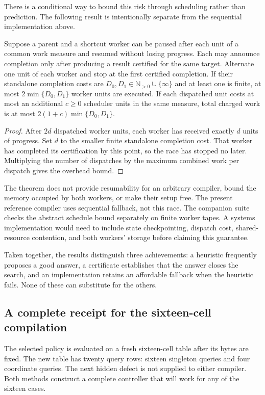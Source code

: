 There is a conditional way to bound this risk through scheduling rather than prediction. The following result is intentionally separate from the sequential implementation above.

\begin{SIIproposition}\label{SII:prop:race}
Suppose a parent and a shortcut worker can be paused after each unit of a common work measure and resumed without losing progress. Each may announce completion only after producing a result certified for the same target. Alternate one unit of each worker and stop at the first certified completion. If their standalone completion costs are $D_0,D_1\in\mathbb N_{>0}\cup\{\infty\}$ and at least one is finite, at most $2\min\{D_0,D_1\}$ worker units are executed. If each dispatched unit costs at most an additional $c\geq0$ scheduler units in the same measure, total charged work is at most $2(1+c)\min\{D_0,D_1\}$.
\end{SIIproposition}
\begin{proof}
After $2d$ dispatched worker units, each worker has received exactly $d$ units of progress. Set $d$ to the smaller finite standalone completion cost. That worker has completed its certification by this point, so the race has stopped no later. Multiplying the number of dispatches by the maximum combined work per dispatch gives the overhead bound.
\end{proof}

The theorem does not provide resumability for an arbitrary compiler, bound the memory occupied by both workers, or make their setup free. The present reference compiler uses sequential fallback, not this race. The companion suite checks the abstract schedule bound separately on finite worker tapes. A systems implementation would need to include state checkpointing, dispatch cost, shared-resource contention, and both workers' storage before claiming this guarantee.

Taken together, the results distinguish three achievements: a heuristic frequently proposes a good answer, a certificate establishes that the answer closes the search, and an implementation retains an affordable fallback when the heuristic fails. None of these can substitute for the others.

\subsection{A complete receipt for the sixteen-cell compilation}
The selected policy is evaluated on a fresh sixteen-cell table after its bytes are fixed. The new table has twenty query rows: sixteen singleton queries and four coordinate queries. The next hidden defect is not supplied to either compiler. Both methods construct a complete controller that will work for any of the sixteen cases.

